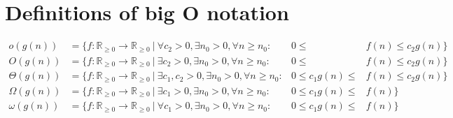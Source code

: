 \documentclass{ucalgthes1}
\theoremstyle{definition}
\newcommand{\RRgez}{\mathbb{R}_{\ge 0}}
\begin{document}
\section{Definitions of big O notation}
\begin{align*}
o(g(n)) &= \{ f : \RRgez \rightarrow \RRgez ~|~ \forall c_2 > 0, \exists n_0 > 0, \forall n \ge n_0 :& 0 \le &f(n) \le c_2g(n) \} \\
O(g(n)) &= \{ f : \RRgez \rightarrow \RRgez ~|~ \exists c_2 > 0, \exists n_0 > 0, \forall n \ge n_0 :& 0 \le &f(n) \le c_2g(n) \} \\
\Theta(g(n)) &= \{ f : \RRgez \rightarrow \RRgez ~|~ \exists c_1, c_2 > 0, \exists n_0 > 0, \forall n \ge n_0 :& 0 \le c_1g(n) \le &f(n) \le c_2g(n) \} \\
\Omega(g(n)) &= \{ f : \RRgez \rightarrow \RRgez ~|~ \exists c_1 > 0, \exists n_0 > 0, \forall n \ge n_0 :& 0 \le c_1g(n) \le &f(n) \} \\
\omega(g(n)) &= \{ f : \RRgez \rightarrow \RRgez ~|~ \forall c_1 > 0, \exists n_0 > 0, \forall n \ge n_0 :& 0 \le c_1g(n) \le &f(n) \} 
\end{align*}




\end{document}
